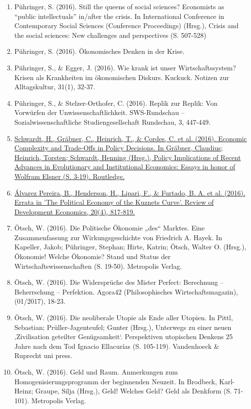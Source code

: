 \begin{enumerate}
	 \item Pühringer, S. (2016). Still the queens of social sciences? Economists as “public intellectuals” in/after the crisis. In International Conference in Contemporary Social Sciences (Conference Proceedings) (Hrsg.), Crisis and the social sciences: New challenges and perspectives (S. 507-528)
	 \item Pühringer, S. (2016). Ökonomisches Denken in der Krise.
	 \item Pühringer, S., \& Egger, J. (2016). Wie krank ist unser Wirtschaftssystem? Krisen als Krankheiten im ökonomischen Diskurs. Kuckuck. Notizen zur Alltagskultur, 31(1), 32-37.
	 \item Pühringer, S., \& Stelzer-Orthofer, C. (2016). Replik zur Replik: Von Vorwürfen der Unwissenschaftlichkeit. SWS-Rundschau -- Sozialwissenschaftliche Studiengesellschaft Rundschau, 3, 447-449.
	 \item \href{https://doi.org/10.4324/9781315714257-3}{Schwardt, H., Gräbner, C., Heinrich, T., \& Cordes, C. et al. (2016). Economic Complexity and Trade-Offs in Policy Decisions. In Gräbner, Claudius; Heinrich, Torsten; Schwardt, Henning (Hrsg.), Policy Implications of Recent Advances in Evolutionary and Institutional Economics: Essays in honor of Wolfram Elsner (S. 3-19). Routledge.}
	 \item \href{https://doi.org/10.1111/rode.12285}{Álvarez Pereira, B., Henderson, H., Lipari, F., \& Furtado, B. A. et al. (2016). Errata in 'The Political Economy of the Kuznets Curve'. Review of Development Economics, 20(4), 817-819.}
	 \item Ötsch, W. (2016). Die Politische Ökonomie „des“ Marktes. Eine Zusammenfassung zur Wirkungsgeschichte von Friedrich A. Hayek. In Kapeller, Jakob; Pühringer, Stephan; Hirte, Katrin; Ötsch, Walter O. (Hrsg.), Ökonomie! Welche Ökonomie? Stand und Status der Wirtschaftswissenschaften (S. 19-50). Metropolis Verlag.
	 \item Ötsch, W. (2016). Die Widersprüche des Mister Perfect: Berechnung – Beherrschung – Perfektion. Agora42 (Philosophisches Wirtschaftsmagazin), (01/2017), 18-23.
	 \item Ötsch, W. (2016). Die neoliberale Utopie als Ende aller Utopien. In Pittl, Sebastian; Prüller-Jagenteufel; Gunter (Hrsg.), Unterwegs zu einer neuen ‚Zivilisation geteilter Genügsamkeit‘. Perspektiven utopischen Denkens 25 Jahre nach dem Tod Ignacio Ellacurías (S. 105-119). Vandenhoeck \& Ruprecht uni press.
	 \item Ötsch, W. (2016). Geld und Raum. Anmerkungen zum Homogenisierungsprogramm der beginnenden Neuzeit. In Brodbeck, Karl-Heinz; Graupe, Silja (Hrsg.), Geld! Welches Geld? Geld als Denkform (S. 71-101). Metropolis Verlag.

\end{enumerate}
